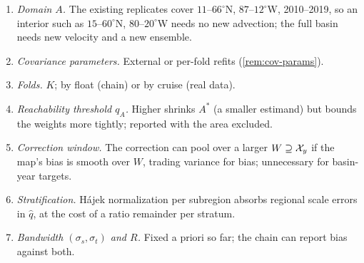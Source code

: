 \begin{enumerate}
  \item \emph{Domain $A$.} The existing replicates cover $11$--$66^\circ$N, $87$--$12^\circ$W, 2010--2019,
        so an interior such as $15$--$60^\circ$N, $80$--$20^\circ$W needs no new advection; the full basin
        needs new velocity and a new ensemble.
  \item \emph{Covariance parameters.} External or per-fold refits (\cref{rem:cov-params}).
  \item \emph{Folds.} $K$; by float (chain) or by cruise (real data).
  \item \emph{Reachability threshold $q_A$.} Higher shrinks $A^*$ (a smaller estimand) but bounds the
        weights more tightly; reported with the area excluded.
  \item \emph{Correction window.} The correction can pool over a larger $W\supseteq\mathcal{X}_y$ if the map's bias
        is smooth over $W$, trading variance for bias; unnecessary for basin-year targets.
  \item \emph{Stratification.} Hájek normalization per subregion absorbs regional scale errors in $\hat q$,
        at the cost of a ratio remainder per stratum.
  \item \emph{Bandwidth $(\sigma_s,\sigma_t)$ and $R$.} Fixed a priori so far; the chain can report bias
        against both.
\end{enumerate}
